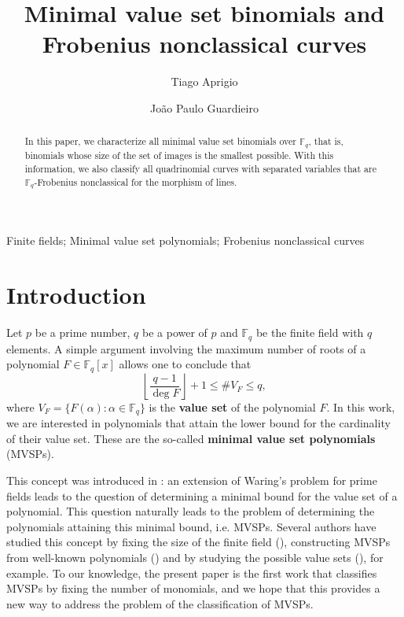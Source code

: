 \documentclass[preprint,12pt]{elsarticle}
\begin{document}
\begin{frontmatter}

\title{Minimal value set binomials and Frobenius nonclassical curves}
\author[1]{Tiago Aprigio}
\author[2]{João Paulo Guardieiro}



\begin{abstract}
    In this paper, we characterize all minimal value set binomials over $\mathbb{F}_q$, that is, binomials whose size of the set of images is the smallest possible. With this information, we also classify all quadrinomial curves with separated variables that are $\mathbb{F}_q$-Frobenius nonclassical for the morphism of lines.
\end{abstract}

\begin{keyword}
    Finite fields; Minimal value set polynomials; Frobenius nonclassical curves
\end{keyword}

\end{frontmatter}

\section{Introduction}

Let $p$ be a prime number, $q$ be a power of $p$ and $\mathbb{F}_q$ be the finite field with $q$ elements. A simple argument involving the maximum number of roots of a polynomial $F \in \mathbb{F}_q[x]$ allows one to conclude that
$$\left\lfloor \frac{q - 1}{\deg F}\right\rfloor + 1 \leq \# V_F \leq q,$$
where $V_F = \{F(\alpha) : \alpha \in \mathbb{F}_q\}$ is the \textbf{value set} of the polynomial $F$. In this work, we are interested in polynomials that attain the lower bound for the cardinality of their value set. These are the so-called \textbf{minimal value set polynomials} (MVSPs).

This concept was introduced in \cite{carlitz61}: an extension of Waring's problem for prime fields leads to the question of determining a minimal bound for the value set of a polynomial. This question naturally leads to the problem of determining the polynomials attaining this minimal bound, i.e. MVSPs. Several authors have studied this concept by fixing the size of the finite field (\cite{borges-reis1, carlitz61, Mills1964}), constructing MVSPs from well-known polynomials (\cite{chow-et-al}) and by studying the possible value sets (\cite{borges-reis}), for example. To our knowledge, the present paper is the first work that classifies MVSPs by fixing the number of monomials, and we hope that this provides a new way to address the problem of the classification of MVSPs.
\end{document}

